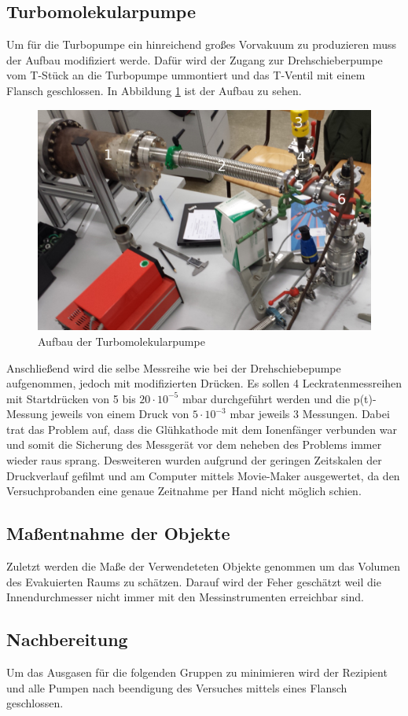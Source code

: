 \subsection{Turbomolekularpumpe}
Um für die Turbopumpe ein hinreichend großes Vorvakuum zu produzieren muss der Aufbau modifiziert werde. Dafür wird der Zugang zur Drehschieberpumpe vom T-Stück an die Turbopumpe ummontiert und das T-Ventil mit einem Flansch geschlossen. In Abbildung \ref{fig:Turbo} ist der Aufbau zu sehen. 
\begin{figure}[htpb]
  \centering
  \includegraphics[width=\textwidth]{picture/Aufgabe2.jpg}
  \caption{Aufbau der Turbomolekularpumpe}
  \label{fig:Turbo}
\end{figure}
Anschließend wird die selbe Messreihe wie bei der Drehschiebepumpe aufgenommen, jedoch mit modifizierten Drücken. Es sollen 4 Leckratenmessreihen mit Startdrücken von 5 bis $20 \cdot 10^{-5}$ mbar durchgeführt werden und die p(t)-Messung jeweils von einem Druck von $5 \cdot 10^{-3}$ mbar jeweils 3 Messungen. Dabei trat das Problem auf, dass die Glühkathode mit dem Ionenfänger verbunden war und somit die Sicherung des Messgerät vor dem neheben des Problems immer wieder raus sprang. Desweiteren wurden aufgrund der geringen Zeitskalen der Druckverlauf gefilmt und am Computer mittels Movie-Maker ausgewertet, da den Versuchprobanden eine genaue Zeitnahme per Hand nicht möglich schien.
\subsection{Maßentnahme der Objekte}
Zuletzt werden die Maße der Verwendeteten Objekte genommen um das Volumen des Evakuierten Raums zu schätzen. Darauf wird der Feher geschätzt weil die Innendurchmesser nicht immer mit den Messinstrumenten erreichbar sind.
\subsection{Nachbereitung}
Um das Ausgasen für die folgenden Gruppen zu minimieren wird der Rezipient und alle Pumpen nach beendigung des Versuches mittels eines Flansch geschlossen. 
